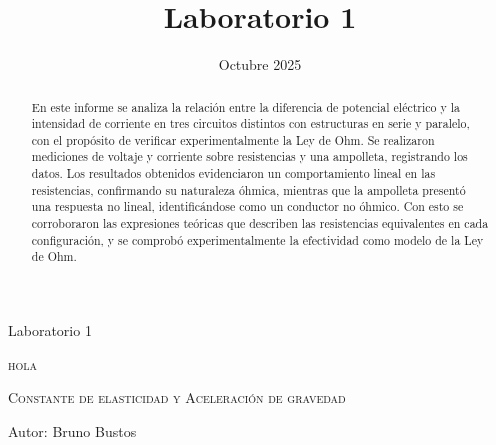 \documentclass{article}
\title{Laboratorio 1}
\date{Octubre 2025}
\begin{document}
\fancyfoot[C]{}          
\fancyhead{}    

\begin{center}
\large Laboratorio 1 \\
\vspace{0.3cm}
{\scshape\Huge hola \par}
\vspace{0.5cm}
{\scshape\Large Constante de elasticidad y Aceleración de gravedad \par}
\vspace{1.5cm}
{\large Autor: Bruno Bustos}
\vspace{0.3cm}
\large 
\\ 
\end{center}
\vspace{1cm}

\begin{abstract}
En este informe se analiza la relación entre la diferencia de potencial eléctrico y la intensidad de corriente en tres circuitos distintos con estructuras en serie y paralelo, con el propósito de verificar experimentalmente la Ley de Ohm. Se realizaron mediciones de voltaje y corriente sobre resistencias y una ampolleta, registrando los datos. Los resultados obtenidos evidenciaron un comportamiento lineal en las resistencias, confirmando su naturaleza óhmica, mientras que la ampolleta presentó una respuesta no lineal, identificándose como un conductor no óhmico.
Con esto se corroboraron las expresiones teóricas que describen las resistencias equivalentes en cada configuración, y se comprobó experimentalmente la efectividad como modelo de la Ley de Ohm. 


\end{abstract}
\end{document}
